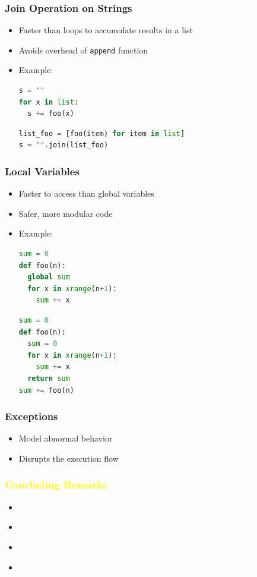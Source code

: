 \documentclass[xcolor=table,10pt,final]{beamer}
\begin{document}
\begin{frame}[fragile]
	\frametitle{Join Operation on Strings}
	\begin{itemize}
		\item Faster than loops to accumulate results in a list
		\item Avoids overhead of {\tt append} function
		\item Example:
			\begin{lstlisting}[language=Python]
s = ""
for x in list:
  s += foo(x)
			\end{lstlisting}
			\begin{lstlisting}[language=Python]
list_foo = [foo(item) for item in list]
s = "".join(list_foo)
			\end{lstlisting}
	\end{itemize}
\end{frame}


\begin{frame}[fragile]
	\frametitle{Local Variables}
	\begin{itemize}
		\item Faster to access than global variables
		\item Safer, more modular code
		\item Example:
			\begin{lstlisting}[language=Python]
sum = 0
def foo(n):
  global sum
  for x in xrange(n+1):
    sum += x
			\end{lstlisting}
			\begin{lstlisting}[language=Python]
sum = 0
def foo(n):
  sum = 0
  for x in xrange(n+1):
    sum += x
  return sum
sum += foo(n)
			\end{lstlisting}
	\end{itemize}
\end{frame}

\begin{frame}
	\frametitle{Exceptions}
	\begin{itemize}
		\item Model abnormal behavior
		\item Disrupts the execution flow 
	\end{itemize}
\end{frame}

{
\begin{frame}
	\frametitle{\textcolor{yellow}{Concluding Remarks}}
	\begin{itemize}
		\item \textcolor{white}{Try a different implementation: recursion $\rightarrow$ iteration}
		\item \textcolor{white}{Try a different algorithm: reduce number of operations}
		\item \textcolor{white}{Use profiler to detect performance bottlenecks}
		\item \textcolor{white}{Follow performance recommendations to avoid costly operations}
	\end{itemize}
\end{frame}
}

\end{document}
